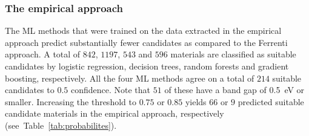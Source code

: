 \documentclass[superscriptaddress,
preprint,
 amsmath,amssymb,
 aps,
]{revtex4-2}
\begin{document}
 
\subsubsection*{The empirical approach}
The ML methods that were trained on the data extracted in the empirical approach predict substantially fewer candidates as compared to the Ferrenti approach. 
A total of $842$, $1197$, $543$ and $596$ materials are classified as suitable candidates by logistic regression, decision trees, random forests and gradient boosting, respectively. All the four ML methods agree on a total of $214$ suitable candidates to $0.5$ confidence.   
Note that $51$ of these have a band gap of \SI{0.5}{\electronvolt} or smaller. Increasing the threshold to $0.75$ or $0.85$ yields $66$ or $9$ predicted suitable candidate materials in the empirical approach, respectively (see~Table~\ref{tab:probabilites}). 
\end{document}
